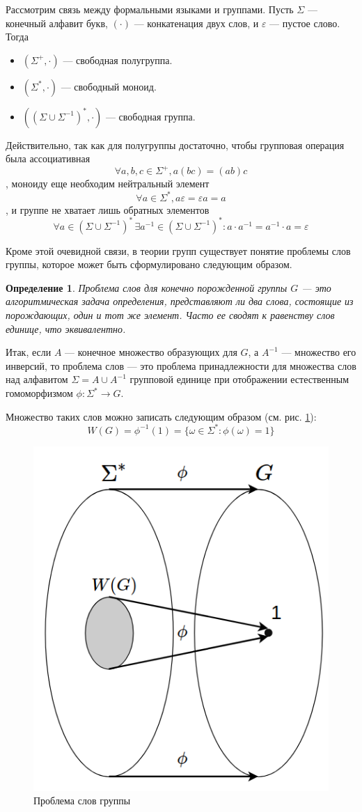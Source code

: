 \documentclass[14pt]{matmex-diploma-custom}
\newtheorem{defn}{Определение}[subsection]
\begin{document}
Рассмотрим связь между формальными языками и группами. 
Пусть $\Sigma$ --- конечный алфавит букв, $(\cdot)$ --- конкатенация двух слов, 
и $\varepsilon$ --- пустое слово.
Тогда 
\begin{itemize}
    \item $(\Sigma^+, \cdot)$ --- свободная полугруппа.
    \item $(\Sigma^*, \cdot)$ --- свободный моноид.
    \item $((\Sigma \cup \Sigma^{-1})^*, \cdot)$ --- свободная группа.
\end{itemize}
 
 Действительно, так как для 
полугруппы достаточно, чтобы групповая операция была ассоциативная
$$\forall a, b, c \in \Sigma^+, a(bc)=(ab)c$$
, моноиду еще необходим нейтральный элемент 
$$\forall a \in \Sigma^*, a\varepsilon=\varepsilon a = a$$
, и группе не хватает лишь обратных элементов
$$\forall a \in (\Sigma \cup \Sigma^{-1})^* \, 
\exists a^{-1} \in (\Sigma \cup \Sigma^{-1})^* : a \cdot a^{-1} = a^{-1} \cdot a = \varepsilon$$

Кроме этой очевидной связи, в теории групп существует понятие проблемы слов группы,
которое может быть сформулировано следующим образом. 

\begin{defn}
Проблема слов для конечно порожденной группы $G$ --- это алгоритмическая задача определения, 
представляют ли два слова, состоящие из порождающих, один и тот же элемент. Часто ее сводят к равенству слов единице, что эквивалентно.
\end{defn}

Итак, если $A$ --- конечное множество образующих для $G$, а $A^{-1}$ --- множество его инверсий, 
то проблема слов --- это проблема принадлежности для множества слов над алфавитом 
$\Sigma=A \cup A^{-1}$ групповой единице при отображении естественным гомоморфизмом
$\phi : \Sigma^* \to G$. 

Множество таких слов можно записать следующим образом (см. рис. \ref{fig:word_problem}):
$$W(G) = \phi^{-1}(1) = 
\{ \omega \in \Sigma^* : \phi(\omega) = 1 \}$$

\begin{figure}[H]
\centering
  \includegraphics[width=0.5\linewidth]{pics/3.png}
  \caption{Проблема слов группы}
  \label{fig:word_problem}
\end{figure}
\end{document}
